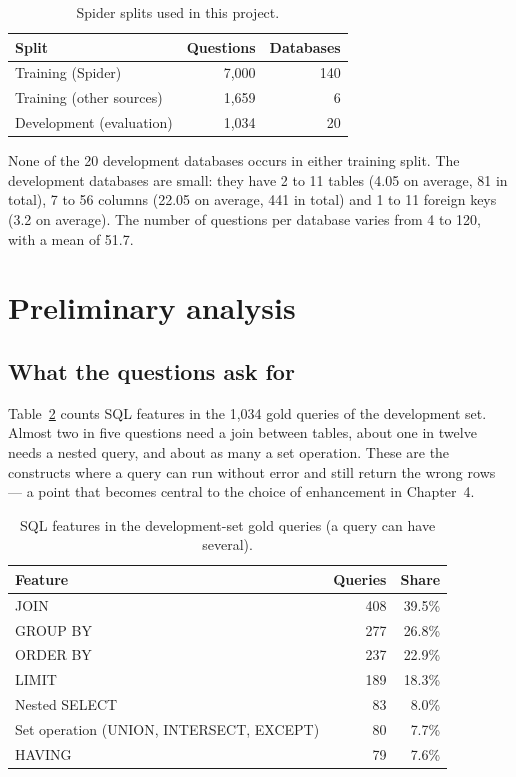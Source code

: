 \begin{table}[!t]
	\centering
	\caption{Spider splits used in this project.}
	\label{tab:splits}
	\begin{tabular}{|l|r|r|}
		\hline
		\textbf{Split} & \textbf{Questions} & \textbf{Databases} \\ \hline
		Training (Spider) & 7,000 & 140 \\ \hline
		Training (other sources) & 1,659 & 6 \\ \hline
		Development (evaluation) & 1,034 & 20 \\ \hline
	\end{tabular}
\end{table}

None of the 20 development databases occurs in either training split. The development databases are small: they have 2 to 11 tables (4.05 on average, 81 in total), 7 to 56 columns (22.05 on average, 441 in total) and 1 to 11 foreign keys (3.2 on average). The number of questions per database varies from 4 to 120, with a mean of 51.7.

\section{Preliminary analysis}

\subsection{What the questions ask for}

Table~\ref{tab:features} counts SQL features in the 1,034 gold queries of the development set. Almost two in five questions need a join between tables, about one in twelve needs a nested query, and about as many a set operation. These are the constructs where a query can run without error and still return the wrong rows --- a point that becomes central to the choice of enhancement in Chapter~4.

\begin{table}[!t]
	\centering
	\caption{SQL features in the development-set gold queries (a query can have several).}
	\label{tab:features}
	\begin{tabular}{|l|r|r|}
		\hline
		\textbf{Feature} & \textbf{Queries} & \textbf{Share} \\ \hline
		JOIN & 408 & 39.5\% \\ \hline
		GROUP BY & 277 & 26.8\% \\ \hline
		ORDER BY & 237 & 22.9\% \\ \hline
		LIMIT & 189 & 18.3\% \\ \hline
		Nested SELECT & 83 & 8.0\% \\ \hline
		Set operation (UNION, INTERSECT, EXCEPT) & 80 & 7.7\% \\ \hline
		HAVING & 79 & 7.6\% \\ \hline
	\end{tabular}
\end{table}

